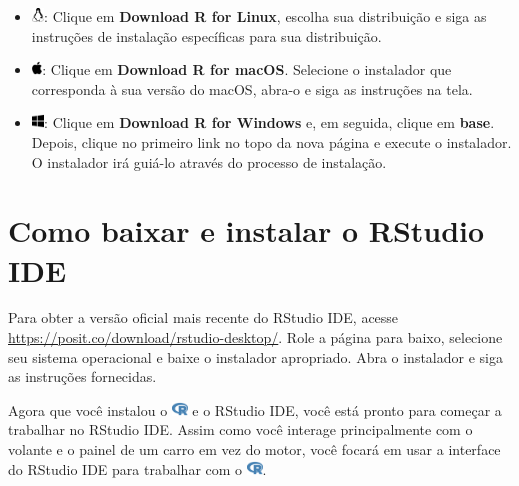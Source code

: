 \documentclass[
  letterpaper,
]{book}
\theoremstyle{definition}
\theoremstyle{plain}
\theoremstyle{remark}
\begin{document}
\begin{itemize}
\item
  \includegraphics[width=0.88em,height=1em]{getting_started_with_r_files/figure-pdf/fa-icon-8b189a97593caea540dafe6d05793999.pdf}:
  Clique em \textbf{Download R for Linux}, escolha sua distribuição e
  siga as instruções de instalação específicas para sua distribuição.
\item
  \includegraphics[width=0.75em,height=1em]{getting_started_with_r_files/figure-pdf/fa-icon-934d7ce2d324ea402ee93b61438edad5.pdf}:
  Clique em \textbf{Download R for macOS}. Selecione o instalador que
  corresponda à sua versão do macOS, abra-o e siga as instruções na
  tela.
\item
  \includegraphics[width=0.88em,height=1em]{getting_started_with_r_files/figure-pdf/fa-icon-b8a547d429c8db6a447f95260c20adaf.pdf}:
  Clique em \textbf{Download R for Windows} e, em seguida, clique em
  \textbf{base}. Depois, clique no primeiro link no topo da nova página
  e execute o instalador. O instalador irá guiá-lo através do processo
  de instalação.
\end{itemize}

\section{Como baixar e instalar o RStudio
IDE}\label{como-baixar-e-instalar-o-rstudio-ide}

Para obter a versão oficial mais recente do RStudio IDE, acesse
\url{https://posit.co/download/rstudio-desktop/}. Role a página para
baixo, selecione seu sistema operacional e baixe o instalador
apropriado. Abra o instalador e siga as instruções fornecidas.

Agora que você instalou o
\includegraphics[width=1.13em,height=1em]{getting_started_with_r_files/figure-pdf/fa-icon-9b00320707d42527dde67262afb33ded.pdf}
e o RStudio IDE, você está pronto para começar a trabalhar no RStudio
IDE. Assim como você interage principalmente com o volante e o painel de
um carro em vez do motor, você focará em usar a interface do RStudio IDE
para trabalhar com o
\includegraphics[width=1.13em,height=1em]{getting_started_with_r_files/figure-pdf/fa-icon-9b00320707d42527dde67262afb33ded.pdf}.
\end{document}
